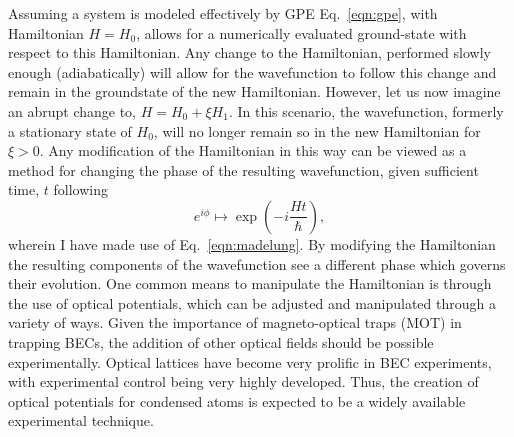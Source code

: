 Assuming a system is modeled effectively by GPE Eq.~\ref{eqn:gpe}, with Hamiltonian $H = H_0$, allows for a numerically evaluated ground-state with respect to this Hamiltonian. Any change to the Hamiltonian, performed slowly enough (adiabatically) will allow for the wavefunction to follow this change and remain in the groundstate of the new Hamiltonian. However, let us now imagine an abrupt change to, $H = H_0 + \xi H_1$. In this scenario, the wavefunction, formerly a stationary state of $H_0$, will no longer remain so in the new Hamiltonian for $\xi > 0$. Any modification of the Hamiltonian in this way can be viewed as a method for changing the phase of the resulting wavefunction, given sufficient time, $t$ following
\begin{equation}
    e^{i\phi} \mapsto \exp\left(-i\frac{Ht}{\hbar}\right),
\end{equation}
wherein I have made use of Eq.~\ref{eqn:madelung}. By modifying the Hamiltonian the resulting components of the wavefunction see a different phase which governs their evolution. One common means to manipulate the Hamiltonian is through the use of optical potentials, which can be adjusted and manipulated through a variety of ways. Given the importance of magneto-optical traps (MOT) in trapping BECs, the addition of other optical fields should be possible experimentally. Optical lattices have become very prolific in BEC experiments, with experimental control being very highly developed. Thus, the creation of optical potentials for condensed atoms is expected to be a widely available experimental technique.

